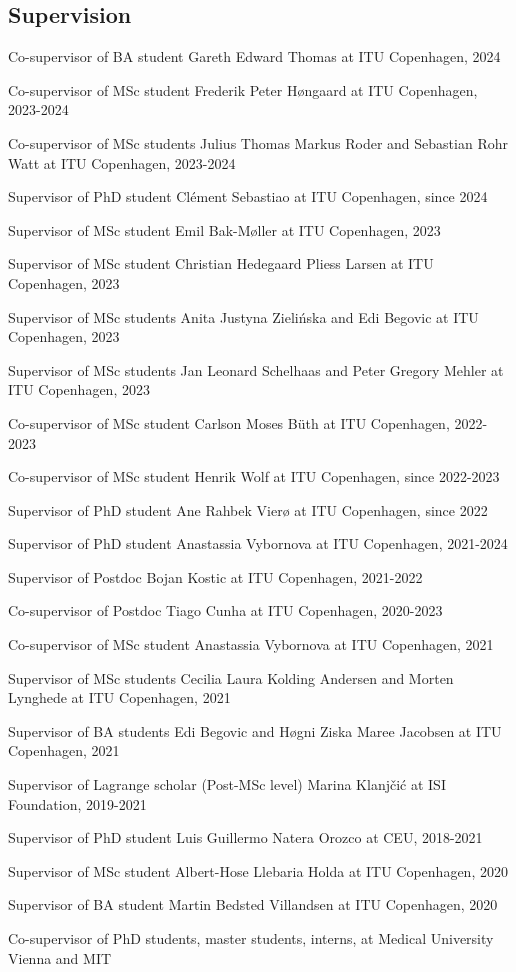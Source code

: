 \documentclass[10pt,a4paper]{article}
\renewenvironment{itemize}{
  \begin{list}{}{
    \setlength{\leftmargin}{1.5em}
    \setlength{\itemsep}{0.25em}
    \setlength{\parskip}{0pt}
    \setlength{\parsep}{0.25em}
  }
}{
  \end{list}
}
\begin{document}
\subsection*{Supervision}
\begin{itemize}
\item{Co-supervisor of BA student Gareth Edward Thomas at ITU Copenhagen, 2024}
\item{Co-supervisor of MSc student Frederik Peter Høngaard at ITU Copenhagen, 2023-2024}
\item{Co-supervisor of MSc students Julius Thomas Markus Roder and Sebastian Rohr Watt at ITU Copenhagen, 2023-2024}
\item{Supervisor of PhD student Clément Sebastiao at ITU Copenhagen, since 2024}
\item{Supervisor of MSc student Emil Bak-Møller at ITU Copenhagen, 2023}
\item{Supervisor of MSc student Christian Hedegaard Pliess Larsen at ITU Copenhagen, 2023}
\item{Supervisor of MSc students Anita Justyna Zielińska and Edi Begovic at ITU Copenhagen, 2023}
\item{Supervisor of MSc students Jan Leonard Schelhaas and Peter Gregory Mehler at ITU Copenhagen, 2023}
\item{Co-supervisor of MSc student Carlson Moses Büth at ITU Copenhagen, 2022-2023}
\item{Co-supervisor of MSc student Henrik Wolf at ITU Copenhagen, since 2022-2023}
\item{Supervisor of PhD student Ane Rahbek Vierø at ITU Copenhagen, since 2022}
\item{Supervisor of PhD student Anastassia Vybornova at ITU Copenhagen, 2021-2024}
\item{Supervisor of Postdoc Bojan Kostic at ITU Copenhagen, 2021-2022}
\item{Co-supervisor of Postdoc Tiago Cunha at ITU Copenhagen, 2020-2023}
\item{Co-supervisor of MSc student Anastassia Vybornova at ITU Copenhagen, 2021}
\item{Supervisor of MSc students Cecilia Laura Kolding Andersen and Morten Lynghede at ITU Copenhagen, 2021}
\item{Supervisor of BA students Edi Begovic and Høgni Ziska Maree Jacobsen at ITU Copenhagen, 2021}
\item{Supervisor of Lagrange scholar (Post-MSc level) Marina Klanj\v{c}i{\'c} at ISI Foundation, 2019-2021}
\item{Supervisor of PhD student Luis Guillermo Natera Orozco at CEU, 2018-2021}
\item{Supervisor of MSc student Albert-Hose Llebaria Holda at ITU Copenhagen, 2020}
\item{Supervisor of BA student Martin Bedsted Villandsen at ITU Copenhagen, 2020}
\item{Co-supervisor of PhD students, master students, interns, at Medical University Vienna and MIT}
\end{itemize}
\end{document}
